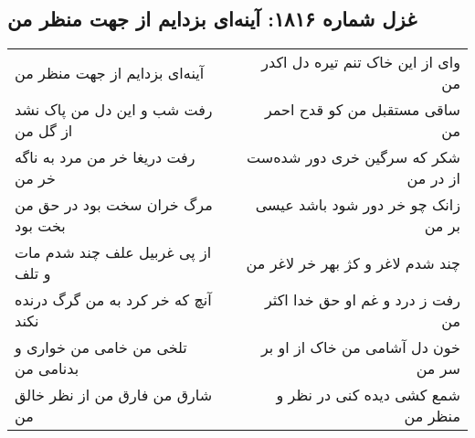 \begin{center}
\section*{غزل شماره ۱۸۱۶: آینه‌ای بزدایم از جهت منظر من}
\label{sec:1816}
\begin{longtable}{l p{0.5cm} r}
آینه‌ای بزدایم از جهت منظر من
&&
وای از این خاک تنم تیره دل اکدر من
\\
رفت شب و این دل من پاک نشد از گل من
&&
ساقی مستقبل من کو قدح احمر من
\\
رفت دریغا خر من مرد به ناگه خر من
&&
شکر که سرگین خری دور شده‌ست از در من
\\
مرگ خران سخت بود در حق من بخت بود
&&
زانک چو خر دور شود باشد عیسی بر من
\\
از پی غربیل علف چند شدم مات و تلف
&&
چند شدم لاغر و کژ بهر خر لاغر من
\\
آنچ که خر کرد به من گرگ درنده نکند
&&
رفت ز درد و غم او حق خدا اکثر من
\\
تلخی من خامی من خواری و بدنامی من
&&
خون دل آشامی من خاک از او بر سر من
\\
شارق من فارق من از نظر خالق من
&&
شمع کشی دیده کنی در نظر و منظر من
\\
\end{longtable}
\end{center}
